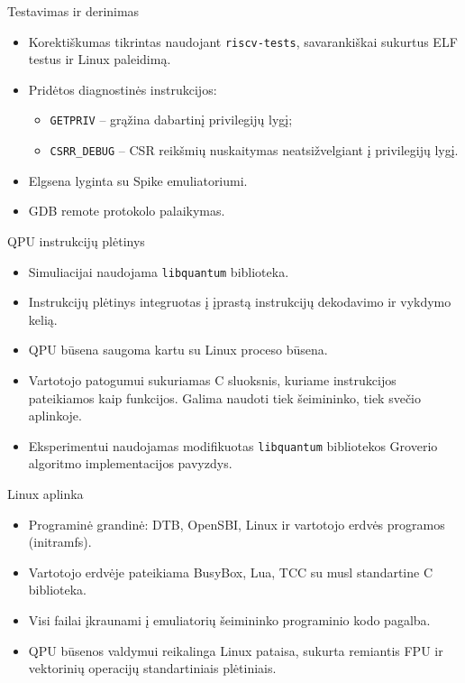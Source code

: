 \documentclass[aspectratio=169]{beamer}
\begin{document}
\begin{frame}{Testavimas ir derinimas}
    \begin{itemize}
        \item Korektiškumas tikrintas naudojant \texttt{riscv-tests}, savarankiškai sukurtus ELF testus ir Linux paleidimą.
        \item Pridėtos diagnostinės instrukcijos:
        \begin{itemize}
            \item \texttt{GETPRIV} -- grąžina dabartinį privilegijų lygį;
            \item \texttt{CSRR\_DEBUG} -- CSR reikšmių nuskaitymas neatsižvelgiant į privilegijų lygį.
        \end{itemize}
        \item Elgsena lyginta su Spike emuliatoriumi.
        \item GDB remote protokolo palaikymas.
    \end{itemize}
\end{frame}

\begin{frame}{QPU instrukcijų plėtinys}
    \begin{itemize}
        \item Simuliacijai naudojama \texttt{libquantum} biblioteka.
        \item Instrukcijų plėtinys integruotas į įprastą instrukcijų dekodavimo ir vykdymo kelią.
        \item QPU būsena saugoma kartu su Linux proceso būsena.
        \item Vartotojo patogumui sukuriamas C sluoksnis, kuriame instrukcijos pateikiamos kaip funkcijos. Galima naudoti tiek šeimininko, tiek svečio aplinkoje.
        \item Eksperimentui naudojamas modifikuotas \texttt{libquantum} bibliotekos Groverio algoritmo implementacijos pavyzdys.
    \end{itemize}
\end{frame}

\begin{frame}{Linux aplinka}
    \begin{itemize}
        \item Programinė grandinė: DTB, OpenSBI, Linux ir vartotojo erdvės programos (initramfs).
        \item Vartotojo erdvėje pateikiama BusyBox, Lua, TCC su musl standartine C biblioteka.
        \item Visi failai įkraunami į emuliatorių šeimininko programinio kodo pagalba.
        \item QPU būsenos valdymui reikalinga Linux pataisa, sukurta remiantis FPU ir vektorinių operacijų standartiniais plėtiniais.
    \end{itemize}
\end{frame}
\end{document}
